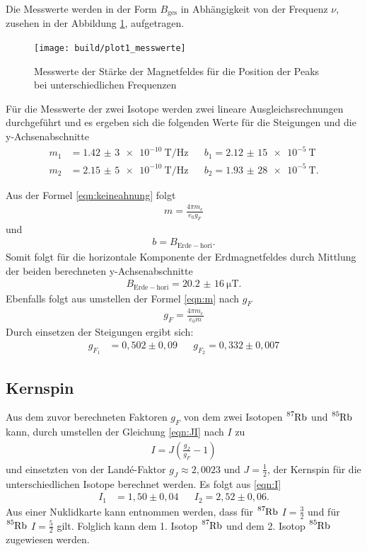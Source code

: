 Die Messwerte werden in der Form $B_\mathrm{ges}$ in Abhängigkeit von der Frequenz $\nu$,
zusehen in der Abbildung \ref{fig:mess}, aufgetragen.

\begin{figure}
  \centering
  \texttt{[image: build/plot1\_messwerte]}
  \caption{Messwerte der Stärke der Magnetfeldes für die Position der Peaks bei unterschiedlichen Frequenzen}
  \label{fig:mess}
\end{figure}
\FloatBarrier
Für die Messwerte der zwei Isotope werden zwei lineare Ausgleichsrechnungen
durchgeführt und es ergeben sich die folgenden Werte für die Steigungen und die y-Achsenabschnitte
\begin{align*}
  m_1&= \SI{1,42(3)e-10}{\tesla\per\hertz}&    &b_1=\SI{2,12(15)e-5}{\tesla}\\
  m_2&= \SI{2,15(5)e-10}{\tesla\per\hertz}&    &b_2=\SI{1,93(28)e-5}{\tesla}.
\end{align*}

Aus der Formel \eqref{eqn:keineahnung} folgt
\begin{align}
m=\frac{4\pi m_e}{e_0 g_F} \label{eqn:m}
\end{align}
und
\begin{align*}
b=B_\mathrm{Erde-hori}.
\end{align*}
Somit folgt für die horizontale Komponente der Erdmagnetfeldes durch Mittlung der
beiden berechneten y-Achsenabschnitte
\begin{align*}
B_\mathrm{Erde-hori}=\SI{20,2(16)}{\micro\tesla}.
\end{align*}
Ebenfalls folgt aus umstellen der Formel \eqref{eqn:m} nach $g_F$
\begin{align}
  g_F=\frac{4\pi m_e}{e_0 m} \label{eqn:g_f}
\end{align}
Durch einsetzen der Steigungen ergibt sich:
\begin{align*}
  g_{F_1} & =0,502\pm0,09 &  & g_{F_2}=0,332\pm0,007
\end{align*}

\subsection{Kernspin}
Aus dem zuvor berechneten Faktoren $g_F$ von dem zwei Isotopen $\ce{^{87}Rb}$ und $\ce{^{85}Rb}$ kann,
durch umstellen der Gleichung \eqref{eqn:JI}
nach $I$ zu
\begin{align}
  I=J\left( \frac{g_J}{g_F}-1\right) \label{eqn:I}
\end{align}
und einsetzten von der Landé-Faktor $g_J\approx2,0023$  und $J=\frac{1}{2}$, der Kernspin für die
unterschiedlichen Isotope berechnet werden.
Es folgt aus \eqref{eqn:I}
\begin{align*}
  I_1&=1,50\pm0,04&   &I_2=2,52\pm0,06.
\end{align*}
Aus einer Nuklidkarte \cite{verhalt} kann entnommen werden, dass für
$\ce{^{87}Rb}$ $I=\frac{3}{2}$
und  für $\ce{^{85}Rb}$ $I=\frac{5}{2}$ gilt.
Folglich kann dem 1. Isotop $\ce{^{87}Rb}$ und dem  2. Isotop $\ce{^{85}Rb}$
zugewiesen werden.
